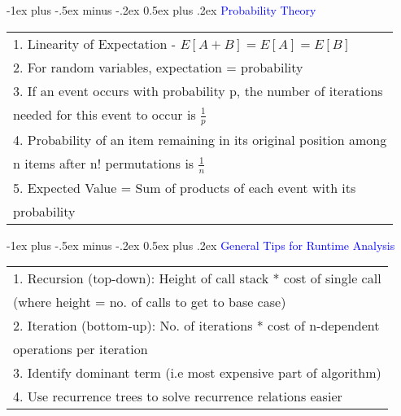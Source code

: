 \documentclass[10pt,landscape]{article}
\makeatletter
\renewcommand{\section}{\@startsection{section}{1}{0mm}%
                                {-1ex plus -.5ex minus -.2ex}%
                                {0.5ex plus .2ex}%
                                {\normalfont\large\bfseries}}
\makeatother
\begin{document}
\begin{multicols}{3}
\section{\textcolor{blue}{Probability Theory}} 
\begin{tabular}{l}
1. Linearity of Expectation - $E[A + B] = E[A] = E[B]$ \\
2. For random variables, expectation = probability \\ 
3. If an event occurs with probability p, the number of iterations \\ needed for this event to occur is $\frac{1}{p}$ \\
4. Probability of an item remaining in its original position among \\ n items after n! permutations is $\frac{1}{n}$ \\ 
5. Expected Value = Sum of products of each event with its \\ probability 
\end{tabular}

\section{\textcolor{blue}{General Tips for Runtime Analysis}} 
\begin{tabular}{l}
1. Recursion (top-down): Height of call stack * cost of single call \\ (where height = no. of calls to get to base case) \\ 
2. Iteration (bottom-up): No. of iterations * cost of n-dependent \\ operations per iteration \\ 
3. Identify dominant term (i.e most expensive part of algorithm) \\ 
4. Use recurrence trees to solve recurrence relations easier 
\end{tabular}


\newpage
\end{multicols}
\end{document}
